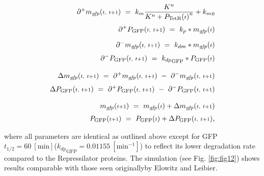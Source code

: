 \documentclass[runningheads,a4paper]{llncs}
\begin{document}
\begin{equation*}
    \begin{aligned}
        \partial^{+}m_{\textrm{\textit{gfp}}}({\scriptstyle t,\ t+1})\ =\ k_{m}\frac{K^{n}}{K^{n}+{P_{\textrm{TetR}}({\scriptstyle t})}^{n}}+{k_{m}}_{0} \\[0.1cm]
        \partial^{+}P_{\textrm{GFP}}({\scriptstyle t,\ t+1})\ =\ k_{p}*{m_{\textrm{\textit{gfp}}}({\scriptstyle t})} \\[0.2cm]
        \partial^{-}m_{\textrm{\textit{gfp}}}({\scriptstyle t,\ t+1})\ =\ k_{dm}*{m_{\textrm{\textit{gfp}}}({\scriptstyle t})} \\[0.1cm]
        \partial^{-}P_{\textrm{GFP}}({\scriptstyle t,\ t+1})\ =\ {k_{dp}}_{\textrm{GFP}}*{P_{\textrm{GFP}}({\scriptstyle t})} \\[0.3cm]
        \Delta m_{\textrm{\textit{gfp}}}({\scriptstyle t,\ t+1})\ =\ \partial^{+}m_{\textrm{\textit{gfp}}}({\scriptstyle t,\ t+1})\ -\ \partial^{-}m_{\textrm{\textit{gfp}}}({\scriptstyle t,\ t+1}) \\[0.1cm]
        \Delta P_{\textrm{GFP}}({\scriptstyle t,\ t+1})\ =\ \partial^{+}P_{\textrm{GFP}}({\scriptstyle t,\ t+1})\ -\ \partial^{-}P_{\textrm{GFP}}({\scriptstyle t,\ t+1}) \\[0.3cm]
        m_{\textrm{\textit{gfp}}}({\scriptstyle t+1})\ =\ m_{\textrm{\textit{gfp}}}({\scriptstyle t}) + \Delta m_{\textrm{\textit{gfp}}}({\scriptstyle t,\ t+1}) \\[0.1cm]
        P_{\textrm{GFP}}({\scriptstyle t+1})\ =\ P_{\textrm{GFP}}({\scriptstyle t}) + \Delta P_{\textrm{GFP}}({\scriptstyle t,\ t+1})\textrm{\large{,}}
    \end{aligned}
\end{equation*}

\noindent where all parameters are identical as outlined above except for GFP $t_{1/2} = 60\ [\textrm{min}]$\linebreak (${k_{dp}}_{\textrm{GFP}} = 0.01155\ [\textrm{min}^{-1}]$) to reflect its lower degradation rate compared to the Repressilator proteins. The simulation (see Fig. \ref{fig:fig12}) shows results comparable with those seen originally\linebreak by Elowitz and Leibier\cite{Elowitz2000d}.
\end{document}
